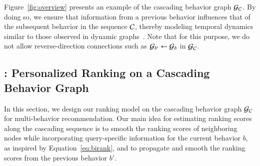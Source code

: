 Figure~\ref{fig:overview} presents an example of the cascading behavior graph $\mathcal{G}_{\mathcal{C}}$. 
By doing so, we ensure that information from a previous behavior influences that of the subsequent behavior in the sequence $\mathcal{C}$, thereby modeling temporal dynamics similar to those observed in dynamic graphs~\cite{LeeLJ22}.
Note that for this purpose, we do not allow reverse-direction connections such as $\mathcal{G}_{b'} \leftarrow \mathcal{G}_{b}$ in $\mathcal{G}_{\mathcal{C}}$.

\subsection{\method: Personalized Ranking on a Cascading Behavior Graph}
\label{sec:proposed:cascrank}

In this section, we design our ranking model \method on the cascading behavior graph $\mathcal{G}_{\mathcal{C}}$ for multi-behavior recommendation. 
Our main idea for estimating ranking scores along the cascading sequence is to smooth the ranking scores of neighboring nodes while incorporating query-specific information for the current behavior $b$, as inspired by Equation~\eqref{eq:birank}, and to propagate and smooth the ranking scores from the previous behavior $b'$.


